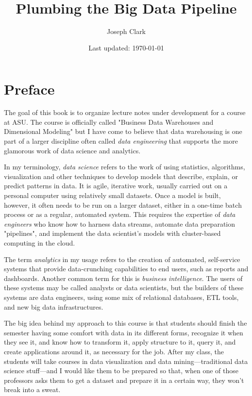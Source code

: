 \documentclass[11pt]{book}
\newcommand{\term}[1]{\emph{#1}} %
\begin{document}
\frontmatter %
\title{Plumbing the Big Data Pipeline}

\author{Joseph Clark}
\date{Last updated: \today}
\maketitle
\tableofcontents

\chapter*{Preface}

The goal of this book is to organize lecture notes under development for a course at ASU.  The course is officially called "Business Data Warehouses and Dimensional Modeling" but I have come to believe that data warehousing is one part of a larger discipline often called \term{data engineering} that supports the more glamorous work of data science and analytics. 

In my terminology, \term{data science} refers to the work of using statistics, algorithms, visualization and other techniques to develop models that describe, explain, or predict patterns in data.  It is agile, iterative work, usually carried out on a personal computer using relatively small datasets.  Once a model is built, however, it often needs to be run on a larger dataset, either in a one-time batch process or as a regular, automated system.  This requires the expertise of \term{data engineers} who know how to harness data streams, automate data preparation "pipelines", and implement the data scientist's models with cluster-based computing in the cloud.  

The term \term{analytics} in my usage refers to the creation of automated, self-service systems that provide data-crunching capabilities to end users, such as reports and dashboards.  Another common term for this is \term{business intelligence}.  The users of these systems may be called analysts or data scientists, but the builders of these systems are data engineers, using some mix of relational databases, ETL tools, and new big data infrastructures.  

The big idea behind my approach to this course is that students should finish the semester having some comfort with data in its different forms, recognize it when they see it, and know how to transform it, apply structure to it, query it, and create applications around it, as necessary for the job.  After my class, the students will take courses in data visualization and data mining---traditional data science stuff---and I would like them to be prepared so that, when one of those professors asks them to get a dataset and prepare it in a certain way, they won't break into a sweat.  
\end{document}
